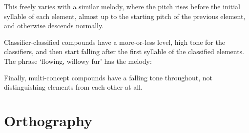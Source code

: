 \begin{center}
\end{center}\vspace{-1em}

\noindent This freely varies with a similar melody, where the pitch rises before
the initial syllable of each element, almost up to the starting pitch of the
previous element, and otherwise descends normally.

\begin{center}
\end{center}\vspace{-1em}

\noindent Classifier-classified compounds have a more-or-less level, high tone
for the classifiers, and then start falling after the first syllable of the
classified elements. The phrase  `flowing, willowy fur'
has the melody:

\begin{center}
\end{center}\vspace{-1em}

\noindent Finally, multi-concept compounds have a falling tone throughout, not
distinguishing elements from each other at all.

\pagebreak
\section{Orthography}
